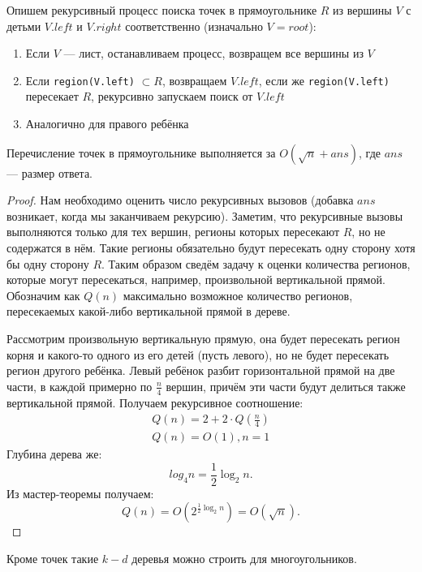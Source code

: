 Опишем рекурсивный процесс поиска точек в прямоугольнике $R$ из вершины $V$ с детьми $V.left$ и 
$V.right$ соответственно (изначально $V = root$):
\begin{enumerate}
  \item Если $V$ --- лист, останавливаем процесс, возвращем все вершины из $V$ \item Если  \texttt{region(V.left)} $\subset R$, возвращаем $V.left$, 
    если же \texttt{region(V.left)} пересекает $R$, рекурсивно запускаем поиск от $V.left$
  \item Аналогично для правого ребёнка
\end{enumerate}

\begin{theorem}
  Перечисление точек в прямоугольнике выполняется за $O(\sqrt{n} + ans)$, где $ans$ --- размер ответа.
\end{theorem}
\begin{proof}
  Нам необходимо оценить число рекурсивных вызовов (добавка $ans$ возникает, когда мы заканчиваем рекурсию).  
  Заметим, что рекурсивные вызовы выполняются только для тех вершин, регионы которых пересекают $R$, но
  не содержатся в нём. Такие регионы обязательно будут пересекать одну сторону хотя бы одну сторону $R$.
  Таким образом сведём задачу к оценки количества регионов, которые могут пересекаться, например, 
  произвольной вертикальной прямой. Обозначим как $Q(n)$ максимально возможное количество регионов,
  пересекаемых какой-либо вертикальной прямой в дереве.

  Рассмотрим произвольную вертикальную прямую, она будет пересекать регион корня и какого-то одного из
  его детей (пусть левого), но не будет пересекать регион другого ребёнка. Левый ребёнок разбит горизонтальной
  прямой на две части, в каждой примерно по $\frac{n}{4}$ вершин, причём эти части будут делиться также
  вертикальной прямой. Получаем рекурсивное соотношение:
  \begin{gather*}
    Q(n) = 2 + 2 \cdot Q \left( \frac{n}{4} \right) \\
    Q(n) = O(1), n = 1
  \end{gather*}
  Глубина дерева же:
  \[
    log_4 n = \frac{1}{2} \log_2 n
  .\] 
  Из мастер-теоремы получаем:
  \[
    Q(n) = O(2^{\frac{1}{2} \log_2 n}) = O(\sqrt{n})
  .\] 
  
\end{proof}

Кроме точек такие $k-d$ деревья можно строить для многоугольников.

